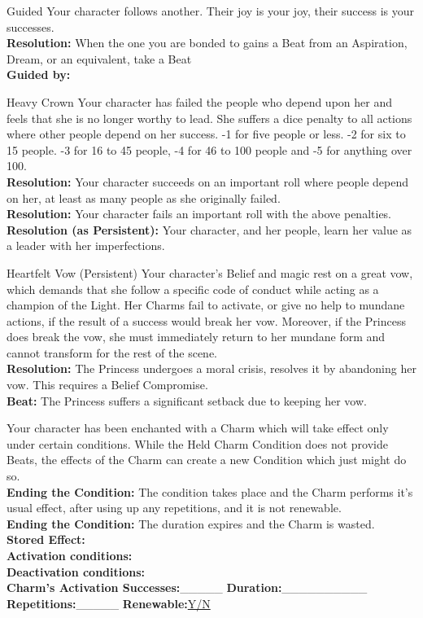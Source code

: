 \documentclass[10pt, frontgrid, backgrid]{flacards}
\begin{document}
\Cond
{Guided}
{Your character follows another. Their joy is your joy, their success is your successes. \\
\textbf{Resolution:} When the one you are bonded to gains a Beat from an Aspiration, Dream, or an equivalent, take a Beat\\
\textbf{Guided by:} \fillunderline}


\Cond
{Heavy Crown}
{Your character has failed the people who depend upon her and feels that she is no longer worthy to lead. She suffers a dice penalty to all actions where other people depend on her success. -1 for five people or less. -2 for six to 15 people. -3 for 16 to 45 people, -4 for 46 to 100 people and -5 for anything over 100.\\
\textbf{Resolution:} Your character succeeds on an important roll where people depend on her, at least as many people as she originally failed.\\
\textbf{Resolution:} Your character fails an important roll with the above penalties.\\
\textbf{Resolution (as Persistent):} Your character, and her people, learn her value as a leader with her imperfections. 
}

\Cond
{Heartfelt Vow (Persistent)}
{
Your character’s Belief and magic rest on a great vow, which demands that she follow a specific code of conduct while acting as a champion of the Light. Her Charms fail to activate, or give no help to mundane actions, if the result of a success would break her vow. Moreover, if the Princess does break the vow, she must immediately return to her mundane form and cannot transform for the rest of the scene.\\
\textbf{Resolution:} The Princess undergoes a moral crisis, resolves it by abandoning her vow. This requires a Belief Compromise. \\
\textbf{Beat:} The Princess suffers a significant setback due to keeping her vow.}

{Your character has been enchanted with a Charm which will take effect only under certain conditions. While the Held Charm Condition does not provide Beats, the effects of the Charm can create a new Condition which just might do so. \\
\textbf{Ending the Condition:} The condition takes place and the Charm performs it's usual effect, after using up any repetitions, and it is not renewable. \\
\textbf{Ending the Condition:} The duration expires and the Charm is wasted. \\
\textbf{Stored Effect:}\fillunderline \\
\textbf{Activation conditions:}\fillunderline \\
\textbf{Deactivation conditions:}\fillunderline \\
\textbf{Charm's Activation Successes:}\_\_\_\_\_ 
\textbf{Duration:}\_\_\_\_\_\_\_\_\_\_ \\
\textbf{Repetitions:}\_\_\_\_\_ 
\textbf{Renewable:}\underline{Y/N}}
\end{document}
